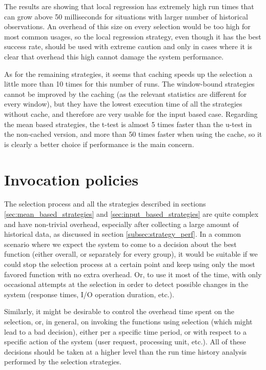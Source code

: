 The results are showing that local regression has extremely high run times that can grow above 50 milliseconds for situations with larger number of historical observations. An overhead of this size on every selection would be too high for most common usages, so the local regression strategy, even though it has the best success rate, should be used with extreme caution and only in cases where it is clear that overhead this high cannot damage the system performance. 

As for the remaining strategies, it seems that caching speeds up the selection a little more than 10 times for this number of runs. The window-bound strategies cannot be improved by the caching (as the relevant statistics are different for every window), but they have the lowest execution time of all the strategies without cache, and therefore are very usable for the input based case. Regarding the mean based strategies, the t-test is almost 5 times faster than the u-test in the non-cached version, and more than 50 times faster when using the cache, so it is clearly a better choice if performance is the main concern.

\section{Invocation policies}
\label{sec:policies}

The selection process and all the strategies described in sections \ref{sec:mean_based_strategies} and \ref{sec:input_based_strategies} are quite complex and have non-trivial overhead, especially after collecting a large amount of historical data, as discussed in section \ref{subsec:strategy_perf}. In a common scenario where we expect the system to come to a decision about the best function (either overall, or separately for every group), it would be suitable if we could stop the selection process at a certain point and keep using only the most favored function with no extra overhead. Or, to use it most of the time, with only occasional attempts at the selection in order to detect possible changes in the system (response times, I/O operation duration, etc.).

Similarly, it might be desirable to control the overhead time spent on the selection, or, in general, on invoking the functions using selection (which might lead to a bad decision), either per a specific time period, or with respect to a specific action of the system (user request, processing unit, etc.). All of these decisions should be taken at a higher level than the run time history analysis performed by the selection strategies.  

